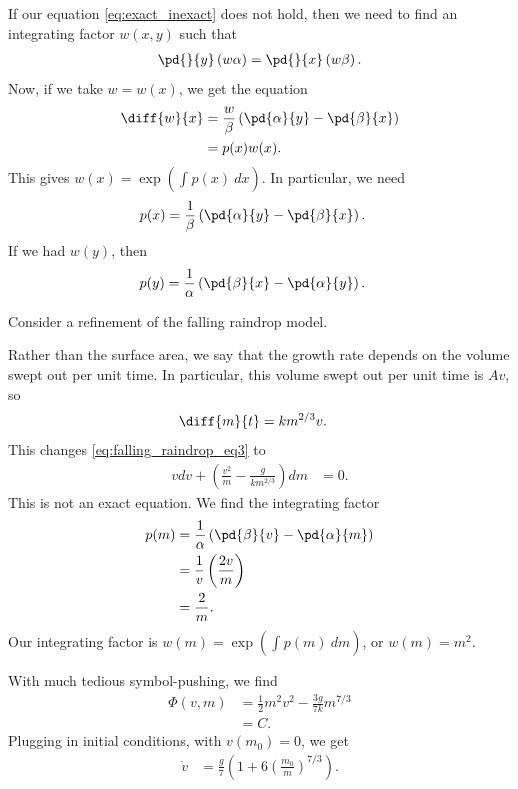 \documentclass[10pt]{mypackage}
\begin{document}
  \begin{example}
    If our equation \eqref{eq:exact_inexact} does not hold, then we need to find an integrating factor $w\left( x,y \right)$ such that
    \begin{align*}
      \pd{}{y}\left( w\alpha \right) = \pd{}{x}\left( w\beta \right).
    \end{align*}
    Now, if we take $w = w(x)$, we get the equation
    \begin{align*}
      \diff{w}{x} &= \frac{w}{\beta}\left( \pd{\alpha}{y} - \pd{\beta}{x} \right)\\
                  &= p(x)w(x).
    \end{align*}
    This gives $w(x) = \exp\left( \int_{}^{} p(x)\:dx \right)$. In particular, we need
    \begin{align*}
      p(x) &= \frac{1}{\beta}\left( \pd{\alpha}{y} - \pd{\beta}{x} \right).
    \end{align*}
    If we had $w(y)$, then
    \begin{align*}
      p(y) &= \frac{1}{\alpha}\left( \pd{\beta}{x} - \pd{\alpha}{y} \right).
    \end{align*}
  \end{example}
  \begin{example}
    Consider a refinement of the falling raindrop model.\newline

    Rather than the surface area, we say that the growth rate depends on the volume swept out per unit time. In particular, this volume swept out per unit time is $Av$, so
    \begin{align*}
      \diff{m}{t} &= km^{2/3} v.
    \end{align*}
    This changes \eqref{eq:falling_raindrop_eq3} to
    \begin{align*}
      v dv + \left( \frac{v^2}{m} - \frac{g}{km^{2/3}} \right) dm &= 0.
    \end{align*}
    This is not an exact equation. We find the integrating factor
    \begin{align*}
      p(m) &= \frac{1}{\alpha}\left( \pd{\beta}{v} - \pd{\alpha}{m} \right)\\
           &= \frac{1}{v}\left( \frac{2v}{m} \right)\\
           &= \frac{2}{m}.
    \end{align*}
    Our integrating factor is $w(m) = \exp\left( \int_{}^{} p(m)\:dm \right)$, or $w(m) = m^2$.\newline

    With much tedious symbol-pushing, we find
    \begin{align*}
      \Phi(v,m) &= \frac{1}{2}m^2v^2 - \frac{3g}{7k}m^{7/3}\\
                &= C.
    \end{align*}
    Plugging in initial conditions, with $v\left( m_0 \right)= 0$, we get
    \begin{align*}
      \dot{v} &= \frac{g}{7}\left( 1 + 6\left( \frac{m_0}{m} \right)^{7/3} \right).
    \end{align*}
    
  \end{example}
  
\end{document}
